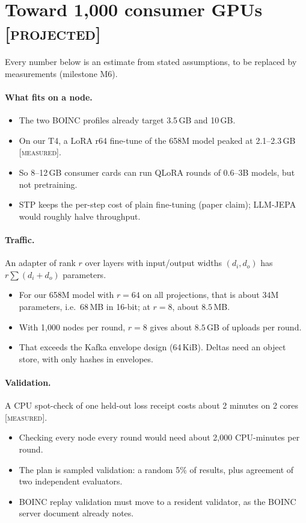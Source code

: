 \documentclass[11pt]{article}
\newcommand{\measured}{\textnormal{\textsc{[measured]}}}
\newcommand{\projected}{\textnormal{\textsc{[projected]}}}
\begin{document}
\section{Toward 1{,}000 consumer GPUs \projected}
\label{sec:scale}
Every number below is an estimate from stated assumptions, to be replaced by measurements (milestone M6).

\paragraph{What fits on a node.}
\begin{itemize}
\item The two BOINC profiles already target 3.5\,GB and 10\,GB.
\item On our T4, a LoRA r64 fine-tune of the 658M model peaked at 2.1--2.3\,GB \measured.
\item So 8--12\,GB consumer cards can run QLoRA rounds of 0.6--3B models, but not pretraining.
\item STP keeps the per-step cost of plain fine-tuning (paper claim); LLM-JEPA would roughly halve throughput.
\end{itemize}

\paragraph{Traffic.} An adapter of rank $r$ over layers with input/output widths $(d_i,d_o)$ has
$r\sum(d_i+d_o)$ parameters.
\begin{itemize}
\item For our 658M model with $r=64$ on all projections, that is about $34$M parameters, i.e.\ $68$\,MB in 16-bit; at
$r=8$, about $8.5$\,MB.
\item With 1{,}000 nodes per round, $r=8$ gives about $8.5$\,GB of uploads per round.
\item That exceeds the Kafka envelope design (64\,KiB). Deltas need an object store, with only hashes in envelopes.
\end{itemize}

\paragraph{Validation.} A CPU spot-check of one held-out loss receipt costs about 2 minutes on 2 cores \measured.
\begin{itemize}
\item Checking every node every round would need about 2{,}000 CPU-minutes per round.
\item The plan is sampled validation: a random 5\% of results, plus agreement of two independent evaluators.
\item BOINC replay validation must move to a resident validator, as the BOINC server document already notes.
\end{itemize}
\end{document}
